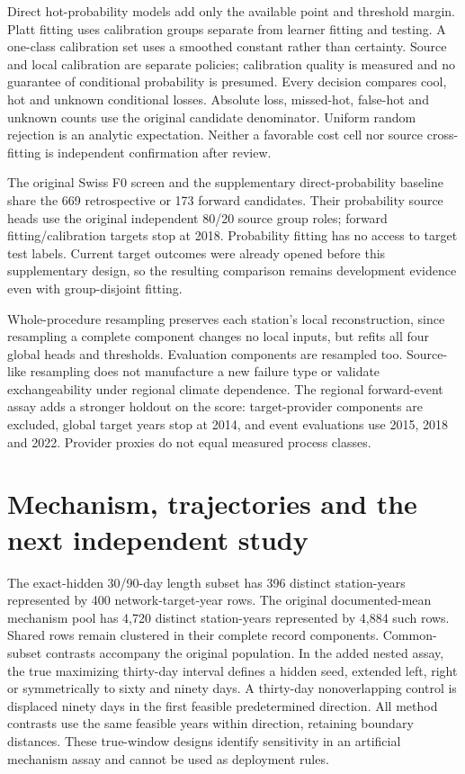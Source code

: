 \documentclass[draft]{agujournal2025}
\begin{document}
Direct hot-probability models add only the available point and threshold margin. Platt fitting uses calibration groups separate from learner fitting and testing. A one-class calibration set uses a smoothed constant rather than certainty. Source and local calibration are separate policies; calibration quality is measured and no guarantee of conditional probability is presumed. Every decision compares cool, hot and unknown conditional losses. Absolute loss, missed-hot, false-hot and unknown counts use the original candidate denominator. Uniform random rejection is an analytic expectation. Neither a favorable cost cell nor source cross-fitting is independent confirmation after review.

The original Swiss F0 screen and the supplementary direct-probability baseline share the 669 retrospective or 173 forward candidates. Their probability source heads use the original independent 80/20 source group roles; forward fitting/calibration targets stop at 2018. Probability fitting has no access to target test labels. Current target outcomes were already opened before this supplementary design, so the resulting comparison remains development evidence even with group-disjoint fitting.

Whole-procedure resampling preserves each station's local reconstruction, since resampling a complete component changes no local inputs, but refits all four global heads and thresholds. Evaluation components are resampled too. Source-like resampling does not manufacture a new failure type or validate exchangeability under regional climate dependence. The regional forward-event assay adds a stronger holdout on the score: target-provider components are excluded, global target years stop at 2014, and event evaluations use 2015, 2018 and 2022. Provider proxies do not equal measured process classes.

\section{Mechanism, trajectories and the next independent study}
The exact-hidden 30/90-day length subset has 396 distinct station-years represented by 400 network-target-year rows. The original documented-mean mechanism pool has 4,720 distinct station-years represented by 4,884 such rows. Shared rows remain clustered in their complete record components. Common-subset contrasts accompany the original population. In the added nested assay, the true maximizing thirty-day interval defines a hidden seed, extended left, right or symmetrically to sixty and ninety days. A thirty-day nonoverlapping control is displaced ninety days in the first feasible predetermined direction. All method contrasts use the same feasible years within direction, retaining boundary distances. These true-window designs identify sensitivity in an artificial mechanism assay and cannot be used as deployment rules.
\end{document}
